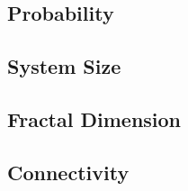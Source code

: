

\subsection{Probability}
\label{ss:exp:probability}


\subsection{System Size}
\label{ss:exp:systemSize}


\subsection{Fractal Dimension}
\label{ss:exp:fractal}
	

\subsection{Connectivity}
\label{ss:exp:connectivity}


